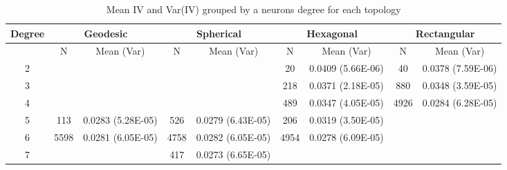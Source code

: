\begin{table}[hbt]
\centering
\begin{minipage}{\textwidth}
\caption{Mean IV and Var(IV) grouped by a neurons degree for each topology}
\label{meanvar1}
\begin{tabular}{|c||cc|cc|cc|cc|}
\hline
\textbf{Degree} & \multicolumn{2}{c|}{\textbf{Geodesic}} &
\multicolumn{2}{c|}{\textbf{Spherical}} &
\multicolumn{2}{c|}{\textbf{Hexagonal}} &
\multicolumn{2}{c|}{\textbf{Rectangular}} \\
\hline
& N & Mean (Var) & N & Mean (Var) & N & Mean (Var) & N & Mean (Var) \\
\hline
2&&&&& 20& 0.0409 (5.66E-06)& 40& 0.0378 (7.59E-06)\\ 
3&&&&& 218& 0.0371 (2.18E-05)& 880& 0.0348 (3.59E-05)\\ 
4&&&&& 489& 0.0347 (4.05E-05)& 4926& 0.0284 (6.28E-05)\\ 
5& 113& 0.0283 (5.28E-05)& 526& 0.0279 (6.43E-05)& 206& 0.0319 (3.50E-05)&&\\ 
6& 5598& 0.0281 (6.05E-05)& 4758& 0.0282 (6.05E-05)& 4954& 0.0278
(6.09E-05)&&\\ 
7&&& 417& 0.0273 (6.65E-05)&&&&\\ 
\hline
\end{tabular} \end{minipage} \end{table}





